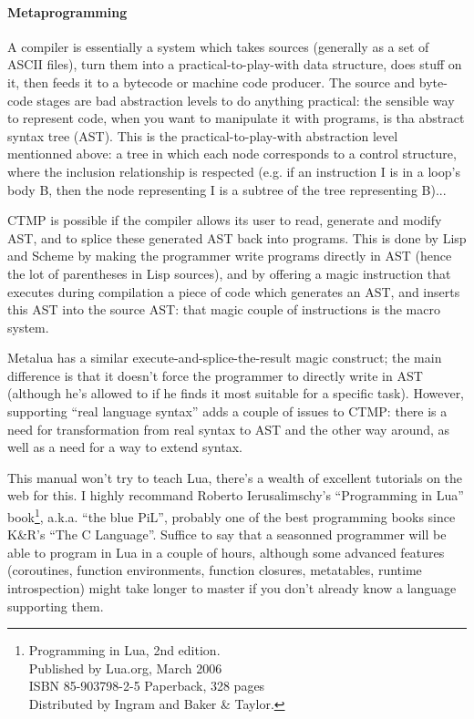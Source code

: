 \paragraph{Metaprogramming}
A compiler is essentially a system which takes sources (generally as
a set of ASCII files), turn them into a practical-to-play-with data
structure, does stuff on it, then feeds it to a bytecode or machine
code producer. The source and byte-code stages are bad abstraction
levels to do anything practical: the sensible way to represent code,
when you want to manipulate it with programs, is tha abstract syntax
tree (AST). This is the practical-to-play-with abstraction level
mentionned above: a tree in which each node corresponds to a control
structure, where the inclusion relationship is respected (e.g. if an
instruction I is in a loop's body B, then the node representing I
is a subtree of the tree representing B)...

CTMP is possible if the compiler allows its user to read, generate and
modify AST, and to splice these generated AST back into programs. This
is done by Lisp and Scheme by making the programmer write programs
directly in AST (hence the lot of parentheses in Lisp sources), and by
offering a magic instruction that executes during compilation a piece
of code which generates an AST, and inserts this AST into the source
AST: that magic couple of instructions is the macro system.

Metalua has a similar execute-and-splice-the-result magic construct;
the main difference is that it doesn't force the programmer to
directly write in AST (although he's allowed to if he finds it most
suitable for a specific task). However, supporting ``real language
syntax'' adds a couple of issues to CTMP: there is a need for
transformation from real syntax to AST and the other way around, as
well as a need for a way to extend syntax.

This manual won't try to teach Lua, there's a wealth of excellent
tutorials on the web for this. I highly recommand Roberto
Ierusalimschy's ``Programming in Lua''
book\footnote{Programming in Lua, 2nd edition.\\
  Published by Lua.org, March 2006\\
  ISBN 85-903798-2-5 Paperback, 328 pages\\
  Distributed by Ingram and Baker \& Taylor.}, 
a.k.a. ``the blue PiL'', probably one of the best programming books
since K\&R's ``The C Language''. Suffice to say that a seasonned
programmer will be able to program in Lua in a couple of hours,
although some advanced features (coroutines, function environments,
function closures, metatables, runtime introspection) might take
longer to master if you don't already know a language supporting them.

